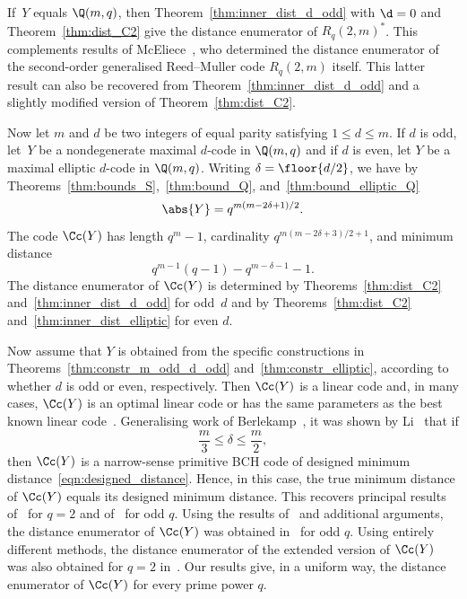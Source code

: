\par
If~$Y$ equals $\Q(m,q)$, then Theorem~\ref{thm:inner_dist_d_odd} with $\d=0$ and Theorem~\ref{thm:dist_C2} give the distance enumerator of $R_q(2,m)^*$. This complements results of McEliece~\cite{McE1969}, who determined the distance enumerator of the second-order generalised Reed--Muller code $R_q(2,m)$ itself. This latter result can also be recovered from Theorem~\ref{thm:inner_dist_d_odd} and a slightly modified version of Theorem~\ref{thm:dist_C2}.
\par
Now let $m$ and $d$ be two integers of equal parity satisfying $1\le d\le m$. If $d$ is odd, let~$Y$ be a nondegenerate maximal $d$-code in $\Q(m,q)$ and if $d$ is even, let $Y$ be a maximal elliptic $d$-code in $\Q(m,q)$. Writing $\delta=\floor{d/2}$, we have by Theorems~\ref{thm:bounds_S},~\ref{thm:bound_Q}, and~\ref{thm:bound_elliptic_Q}
\[
\abs{Y}=q^{m(m-2\delta+1)/2}.
\]
The code $\Cc(Y)$ has length $q^m-1$, cardinality $q^{m(m-2\delta+3)/2+1}$, and minimum distance
\begin{equation}
q^{m-1}(q-1)-q^{m-\delta-1}-1.   \label{eqn:designed_distance}
\end{equation}
The distance enumerator of $\Cc(Y)$ is determined by Theorems~\ref{thm:dist_C2} and~\ref{thm:inner_dist_d_odd} for odd~$d$ and by Theorems~\ref{thm:dist_C2} and~\ref{thm:inner_dist_elliptic} for even $d$.
\par
Now assume that $Y$ is obtained from the specific constructions in Theorems~\ref{thm:constr_m_odd_d_odd} and~\ref{thm:constr_elliptic}, according to whether $d$ is odd or even, respectively. Then $\Cc(Y)$ is a linear code and, in many cases, $\Cc(Y)$ is an optimal linear code or has the same parameters as the best known linear code~\cite{Gra2007}. Generalising work of Berlekamp~\cite{Ber1970}, it was shown by Li~\cite[Proposition~2.5]{Li2017} that if
\[
\frac{m}{3}\le \delta\le \frac{m}{2},
\]
then $\Cc(Y)$ is a narrow-sense primitive BCH code of designed minimum distance~\eqref{eqn:designed_distance}. Hence, in this case, the true minimum distance of $\Cc(Y)$ equals its designed minimum distance. This recovers principal results of~\cite{Ber1970} for $q=2$ and of~\cite{Li2017} for odd $q$. Using the results of~\cite{Sch2015} and additional arguments, the distance enumerator of $\Cc(Y)$ was obtained in~\cite{Li2017} for odd $q$. Using entirely different methods, the distance enumerator of the extended version of $\Cc(Y)$ was also obtained for $q=2$ in~\cite{Ber1970}. Our results give, in a uniform way, the distance enumerator of $\Cc(Y)$ for every prime power $q$. 
